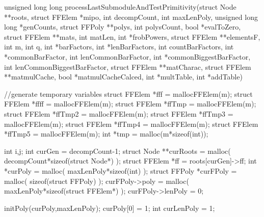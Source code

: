 \begin{ccode}[caption={Aus \url{../Sage/enumeratePCNs.c}},
  label=lst:processLastSubmodule]
unsigned long long processLastSubmoduleAndTestPrimitivity(struct Node **roots,
        struct FFElem *mipo, int decompCount,
        int maxLenPoly, 
        unsigned long long *genCounts, 
        struct FFPoly **polys, int polysCount, bool *evalToZero,
        struct FFElem **mats, int matLen, int *frobPowers,
        struct FFElem **elementsF,
        int m, int q, 
        int *barFactors, int *lenBarFactors, int countBarFactors,
        int *commonBarFactor, int lenCommonBarFactor,
        int *commonBiggestBarFactor, int lenCommonBiggestBarFactor,
        struct FFElem **matCharac,
        struct FFElem **matmulCache, bool *matmulCacheCalced,
        int *multTable, int *addTable){
    //generate temporary variables
    struct FFElem *fff = mallocFFElem(m);
    struct FFElem *ffff = mallocFFElem(m);
    struct FFElem *ffTmp = mallocFFElem(m);
    struct FFElem *ffTmp2 = mallocFFElem(m);
    struct FFElem *ffTmp3 = mallocFFElem(m);
    struct FFElem *ffTmp4 = mallocFFElem(m);
    struct FFElem *ffTmp5 = mallocFFElem(m);
    int *tmp = malloc(m*sizeof(int));

    int i,j;
    int curGen = decompCount-1;
    struct Node **curRoots = malloc( decompCount*sizeof(struct Node*) );
    struct FFElem *ff = roots[curGen]->ff;
    int *curPoly = malloc( maxLenPoly*sizeof(int) );
    struct FFPoly *curFPoly = malloc( sizeof(struct FFPoly) );
    curFPoly->poly = malloc( maxLenPoly*sizeof(struct FFElem*) );
    curFPoly->lenPoly = 0;
    
    initPoly(curPoly,maxLenPoly);
    curPoly[0] = 1;
    int curLenPoly = 1;

}
\end{ccode}
